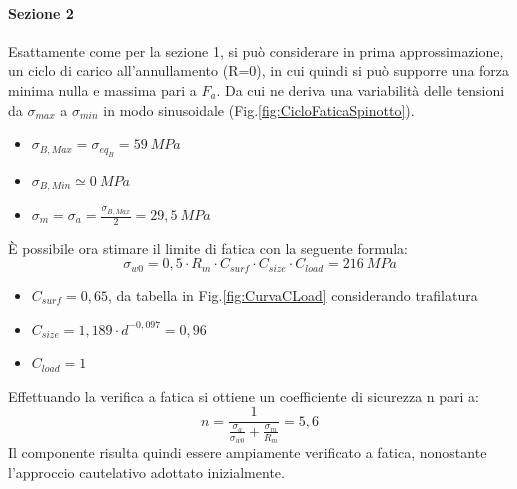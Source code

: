 \paragraph{Sezione 2}
Esattamente come per la sezione 1, si può considerare in prima approssimazione, un ciclo di carico all'annullamento (R=0), in cui quindi si può supporre una forza minima nulla e massima pari a $F_a$. Da cui ne deriva una variabilità delle tensioni da $\sigma_{max}$ a $\sigma_{min}$ in modo sinusoidale (Fig.\ref{fig:CicloFaticaSpinotto}).
\begin{itemize}
    \item $\sigma_{B,Max}=\sigma_{eq_{B}}=59\ MPa$
    \item $\sigma_{B,Min}\simeq0\ MPa$
    \item $\sigma_m=\sigma_a=\frac{\sigma_{B,Max}}{2}=29,5\ MPa$
\end{itemize}
È possibile ora stimare il limite di fatica con la seguente formula:
\begin{equation}
    \sigma_{w0}=0,5\cdot R_m\cdot C_{surf}\cdot C_{size}\cdot C_{load}=216\ MPa
\end{equation}
\begin{itemize}
    \item $C_{surf}=0,65$, da tabella in Fig.\ref{fig:CurvaCLoad} considerando trafilatura 
    \item $C_{size}=1,189\cdot d^{-0,097}=0,96$
    \item $C_{load}=1$
\end{itemize}
Effettuando la verifica a fatica si ottiene un coefficiente di sicurezza n pari a:
\begin{equation}
    n=\frac{1}{\frac{\sigma_a}{\sigma_{w0}}+\frac{\sigma_m}{R_m}}=5,6
\end{equation}
Il componente risulta quindi essere ampiamente verificato a fatica, nonostante l'approccio cautelativo adottato inizialmente.
